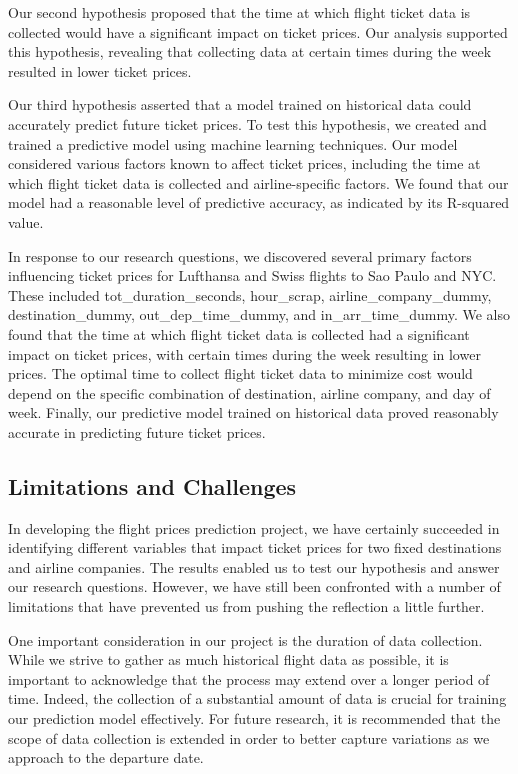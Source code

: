 Our second hypothesis proposed that the time at which flight ticket data is collected would have a significant impact on ticket prices.
Our analysis supported this hypothesis, revealing that collecting data at certain times during the week resulted in lower ticket prices.

Our third hypothesis asserted that a model trained on historical data could accurately predict future ticket prices.
To test this hypothesis, we created and trained a predictive model using machine learning techniques.
Our model considered various factors known to affect ticket prices, including the time at which flight ticket data is collected and airline-specific factors.
We found that our model had a reasonable level of predictive accuracy, as indicated by its R-squared value.

In response to our research questions, we discovered several primary factors influencing ticket prices for Lufthansa and Swiss flights to Sao Paulo and NYC.
These included tot\_duration\_seconds, hour\_scrap, airline\_company\_dummy, destination\_dummy, out\_dep\_time\_dummy, and in\_arr\_time\_dummy.
We also found that the time at which flight ticket data is collected had a significant impact on ticket prices, with certain times during the week resulting in lower prices.
The optimal time to collect flight ticket data to minimize cost would depend on the specific combination of destination, airline company, and day of week.
Finally, our predictive model trained on historical data proved reasonably accurate in predicting future ticket prices.

\subsection{Limitations and Challenges}
\label{sec:limitation}
In developing the flight prices prediction project, we have certainly succeeded in identifying different variables that impact ticket prices for two fixed destinations and airline companies.
The results enabled us to test our hypothesis and answer our research questions. However, we have still been confronted with a number of limitations that have prevented us from pushing the reflection a little further.

One important consideration in our project is the duration of data collection. While we strive to gather as much historical flight data as possible, it is important to acknowledge that the process may extend over a longer period of time.
Indeed, the collection of a substantial amount of data is crucial for training our prediction model effectively.
For future research, it is recommended that the scope of data collection is extended in order to better capture variations as we approach to the departure date.

